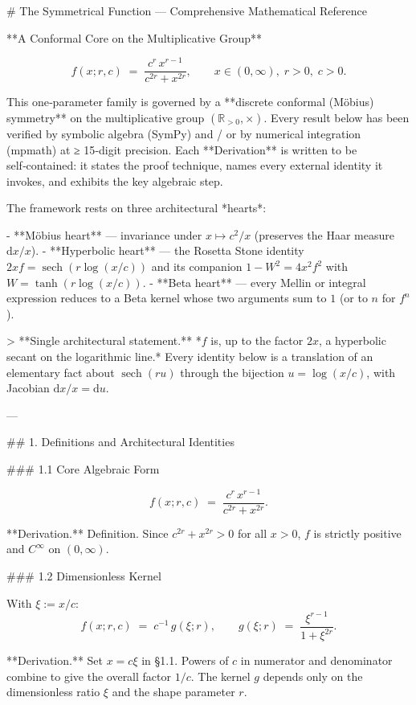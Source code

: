 # The Symmetrical Function — Comprehensive Mathematical Reference

**A Conformal Core on the Multiplicative Group**

$$
f(x;r,c)\;=\;\frac{c^{r}\,x^{r-1}}{c^{2r}+x^{2r}},\qquad x\in(0,\infty),\;r>0,\;c>0.
$$

This one‑parameter family is governed by a **discrete conformal (Möbius) symmetry** on the multiplicative group $(\mathbb R_{>0},\times)$. Every result below has been verified by symbolic algebra (SymPy) and / or by numerical integration (mpmath) at ≥ 15‑digit precision. Each **Derivation** is written to be self‑contained: it states the proof technique, names every external identity it invokes, and exhibits the key algebraic step.

The framework rests on three architectural *hearts*:

- **Möbius heart** — invariance under $x\mapsto c^{2}/x$ (preserves the Haar measure $\mathrm dx/x$).
- **Hyperbolic heart** — the Rosetta Stone identity $2xf=\operatorname{sech}(r\log(x/c))$ and its companion $1-W^{2}=4x^{2}f^{2}$ with $W=\tanh(r\log(x/c))$.
- **Beta heart** — every Mellin or integral expression reduces to a Beta kernel whose two arguments sum to $1$ (or to $n$ for $f^{n}$).

> **Single architectural statement.** *$f$ is, up to the factor $2x$, a hyperbolic secant on the logarithmic line.* Every identity below is a translation of an elementary fact about $\operatorname{sech}(ru)$ through the bijection $u=\log(x/c)$, with Jacobian $\mathrm dx/x=\mathrm du$.

---

## 1. Definitions and Architectural Identities

### 1.1 Core Algebraic Form

$$
f(x;r,c)\;=\;\frac{c^{r}\,x^{r-1}}{c^{2r}+x^{2r}}.
$$

**Derivation.** Definition. Since $c^{2r}+x^{2r}>0$ for all $x>0$, $f$ is strictly positive and $C^{\infty}$ on $(0,\infty)$.

### 1.2 Dimensionless Kernel

With $\xi:=x/c$:
$$
f(x;r,c)\;=\;c^{-1}\,g(\xi;r),\qquad g(\xi;r)\;=\;\frac{\xi^{r-1}}{1+\xi^{2r}}.
$$

**Derivation.** Set $x = c\xi$ in §1.1. Powers of $c$ in numerator and denominator combine to give the overall factor $1/c$. The kernel $g$ depends only on the dimensionless ratio $\xi$ and the shape parameter $r$.

